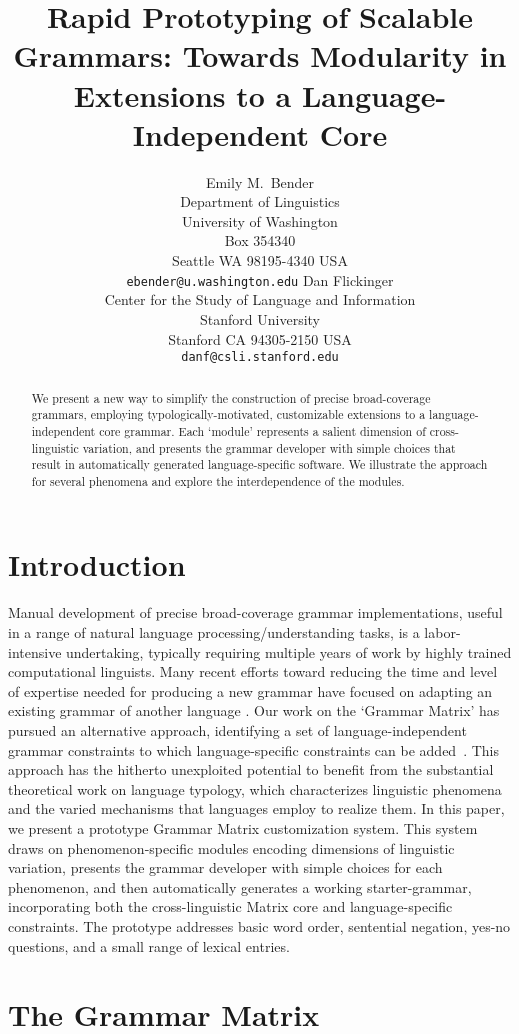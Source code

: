 \documentclass[11pt]{article}
\title{Rapid Prototyping of Scalable Grammars: Towards Modularity in Extensions to a Language-Independent Core}
\author{Emily M.~Bender\\
  Department of Linguistics\\
  University of Washington\\
  Box 354340\\
  Seattle WA 98195-4340 USA\\
  {\tt ebender@u.washington.edu} \And
  Dan Flickinger \\
  Center for the Study of Language and Information\\
  Stanford University\\
  Stanford CA 94305-2150 USA\\
  {\tt danf@csli.stanford.edu}}
\date{}
\begin{document}
\maketitle

\begin{abstract}
We present a new way to simplify the construction
of precise broad-coverage grammars, employing typologically-motivated,
customizable extensions to a language-independent core
grammar.  Each `module' represents a salient dimension of
cross-linguistic variation,
and
presents the grammar developer with simple choices that result in
automatically generated language-specific software.  We
illustrate the approach for several phenomena
and explore the interdependence of the modules.
\end{abstract}

\section{Introduction}

Manual development of precise broad-coverage grammar implementations,
useful in a range of natural language processing/understanding tasks,
is a labor-intensive undertaking, typically requiring multiple years
of work by highly trained computational linguists.  Many recent
efforts toward reducing the time and level of expertise needed for
producing a new grammar have focused on adapting an existing grammar
of another language
\cite{Butt-et-al-02,Kim:Dal:Kap:Kin:Mas:Ohk:03,Bat:Kru:Kru:ta}.  Our
work on the `Grammar Matrix' has pursued an alternative approach,
identifying a set of language-independent grammar constraints
to which language-specific constraints can be
added~\cite{Ben:Fli:Oe:02}.  This 
approach has the hitherto unexploited potential to benefit from the
substantial theoretical work on language typology, which characterizes
linguistic phenomena and the varied mechanisms that languages employ
to realize them.  In this paper, we present a prototype Grammar Matrix
customization system.  This system draws on phenomenon-specific
modules encoding dimensions of linguistic variation, presents the
grammar developer with simple choices for each phenomenon, and then
automatically generates a working starter-grammar, incorporating both
the cross-linguistic Matrix core and language-specific constraints.
The prototype addresses basic word order, sentential
negation, yes-no questions, and a small range of lexical entries.

\section{The Grammar Matrix}
\end{document}
